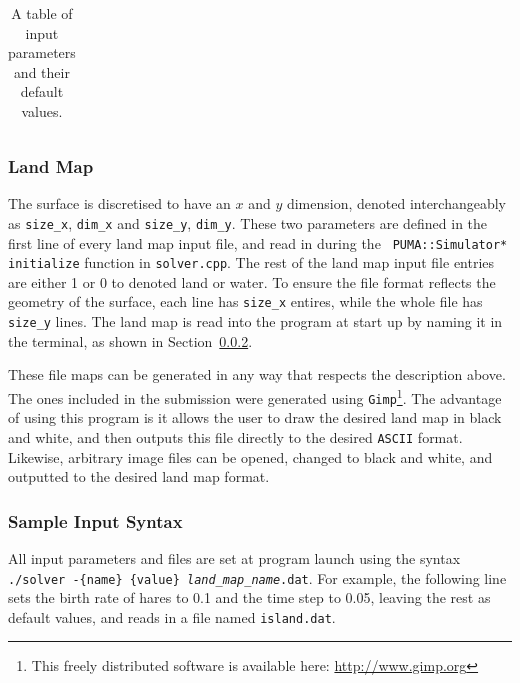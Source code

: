\documentclass[a4paper,11pt]{article}
\begin{document}
{\begin{table}
\begin{tabular}{|l|l|l|l|}
\end{tabular}
\caption{A table of input parameters and their default values.}
\label{tb:parameters}
\end{table}


\subsubsection{Land Map}

The surface is discretised to have an $x$ and $y$ dimension, denoted interchangeably as \texttt{size\_x}, \texttt{dim\_x} and \texttt{size\_y}, \texttt{dim\_y}.  These two parameters are defined in the first line of every land map input file, and read in during the \texttt{ PUMA::Simulator* initialize} function in \texttt{solver.cpp}.  The rest of the land map input file entries are either 1 or 0 to denoted land or water.  To ensure the file format reflects the geometry of the surface, each line has \texttt{size\_x} entires, while the whole file has \texttt{size\_y} lines. The land map is read into the program at start up by naming it in the terminal, as shown in Section~\ref{syntax}.

These file maps can be generated in any way that respects the description above.  The ones included in the submission were generated using \texttt{Gimp}\footnote{This freely distributed software is available here: \url{http://www.gimp.org}}.  The advantage of using this program is it allows the user to draw the desired land map in black and white, and then outputs this file directly to the desired \texttt{ASCII} format.  Likewise, arbitrary image files can be opened, changed to black and white, and outputted to the desired land map format.

  

\subsubsection{Sample Input Syntax}\label{syntax}

All input parameters and files are set at program launch using the syntax \texttt{./solver -\{name\} \{value\} \emph{land\_map\_name}.dat}.  For example, the following line sets the birth rate of hares to 0.1 and the time step to 0.05, leaving the rest as default values, and reads in a file named \texttt{island.dat}.

}
\end{document}
